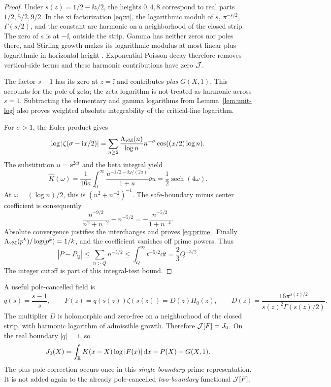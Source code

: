 \begin{proof}
Under \(s(z)=1/2-\ii z/2\), the heights \(0,4,8\) correspond to
real parts \(1/2,5/2,9/2\). In the xi factorization
\eqref{eq:xi}, the logarithmic moduli of \(s\), \(\pi^{-s/2}\),
\(\Gamma(s/2)\), and the constant are harmonic on a neighborhood
of the closed strip. The zero of \(s\) is at \(-\ii\), outside
the strip. Gamma has neither zeros nor poles there, and Stirling
growth makes its logarithmic modulus at most linear plus logarithmic
in horizontal height \cite{DLMFGreenPrime}. Exponential Poisson
decay therefore removes vertical-side terms and these harmonic
contributions have zero \(\mathcal J\).

The factor \(s-1\) has its zero at \(z=\ii\) and contributes
\emph{plus} \(G(X,1)\). This accounts for the pole of zeta; the
zeta logarithm is not treated as harmonic across \(s=1\).
Subtracting the elementary and gamma logarithms from
Lemma~\ref{lem:unit-log} also proves weighted absolute integrability
of the critical-line logarithm.

For \(\sigma>1\), the Euler product gives
\[
 \log|\zeta(\sigma-\mathrm i x/2)|
 =\sum_{n\ge2}\frac{\Lambda_{\rm vM}(n)}{\log n}
       n^{-\sigma}\cos((x/2)\log n).
\]
The substitution \(u=\ee^{2at}\) and the beta integral yield
\[
 \widehat K(\omega)
 =\frac1{16a}\int_0^\infty
       \frac{u^{-1/2-\ii\omega/(2a)}}{1+u}\dd u
 =\frac12\operatorname{sech}(4\omega).
\]
At \(\omega=(\log n)/2\), this is \((n^2+n^{-2})^{-1}\).
The safe-boundary minus center coefficient is consequently
\[
 \frac{n^{-9/2}}{n^2+n^{-2}}-n^{-5/2}
 =-\frac{n^{-5/2}}{1+n^{-4}}.
\]
Absolute convergence justifies the interchanges and proves
\eqref{eq:prime}. Finally
\(\Lambda_{\rm vM}(p^k)/\log(p^k)=1/k\), and the coefficient
vanishes off prime powers. Thus
\[
 |P-P_Q|\le\sum_{n>Q}n^{-5/2}
          \le\int_Q^\infty t^{-5/2}\dd t=\frac23Q^{-3/2}.
\]
The integer cutoff is part of this integral-test bound.
\end{proof}

A useful pole-cancelled field is
\begin{equation}\label{eq:F}
 q(s)=\frac{s-1}{s},\qquad
 F(z)=q(s(z))\zeta(s(z))=D(z)H_0(z),\qquad
 D(z)=\frac{16\pi^{s(z)/2}}{s(z)^2\Gamma(s(z)/2)}.
\end{equation}
The multiplier \(D\) is holomorphic and zero-free on a neighborhood
of the closed strip, with harmonic logarithm of admissible growth.
Therefore \(\mathcal J[F]=J_0\). On the real boundary \(|q|=1\), so
\begin{equation}\label{eq:F-prime}
 J_0(X)=\int_\mathbb R K(x-X)\log|F(x)|\,\mathrm d x-P(X)+G(X,1).
\end{equation}
The plus pole correction occurs once in this \emph{single-boundary}
prime representation. It is not added again to the already
pole-cancelled \emph{two-boundary} functional \(\mathcal J[F]\).


